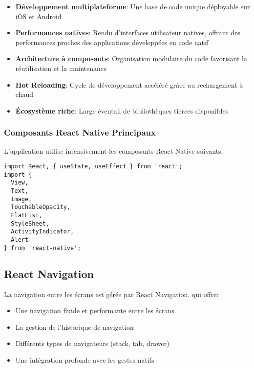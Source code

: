 \begin{itemize}
    \item \textbf{Développement multiplateforme}: Une base de code unique déployable sur iOS et Android
    \item \textbf{Performances natives}: Rendu d'interfaces utilisateur natives, offrant des performances proches des applications développées en code natif
    \item \textbf{Architecture à composants}: Organisation modulaire du code favorisant la réutilisation et la maintenance
    \item \textbf{Hot Reloading}: Cycle de développement accéléré grâce au rechargement à chaud
    \item \textbf{Écosystème riche}: Large éventail de bibliothèques tierces disponibles
\end{itemize}

\subsubsection{Composants React Native Principaux}
L'application utilise intensivement les composants React Native suivants:

\begin{verbatim}
import React, { useState, useEffect } from 'react';
import {
  View,
  Text,
  Image,
  TouchableOpacity,
  FlatList,
  StyleSheet,
  ActivityIndicator,
  Alert
} from 'react-native';
\end{verbatim}

\subsection{React Navigation}

La navigation entre les écrans est gérée par React Navigation, qui offre:

\begin{itemize}
    \item Une navigation fluide et performante entre les écrans
    \item La gestion de l'historique de navigation
    \item Différents types de navigateurs (stack, tab, drawer)
    \item Une intégration profonde avec les gestes natifs
\end{itemize}

